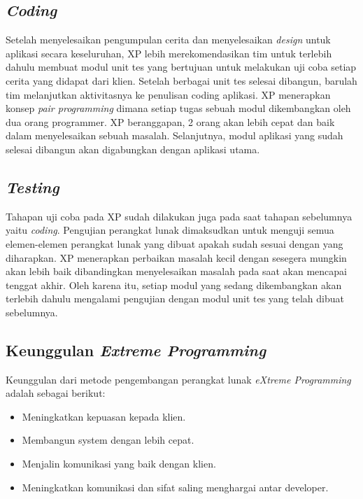 \subsection{\emph{Coding}}
\par Setelah menyelesaikan pengumpulan cerita dan menyelesaikan \textit{design} untuk aplikasi secara keseluruhan, XP lebih merekomendasikan tim untuk terlebih dahulu membuat modul unit tes yang bertujuan untuk melakukan uji coba setiap cerita yang didapat dari klien. Setelah berbagai unit tes selesai dibangun, barulah tim melanjutkan aktivitasnya ke penulisan coding aplikasi. XP menerapkan konsep \textit{pair programming} dimana setiap tugas sebuah modul dikembangkan oleh dua orang programmer. XP beranggapan, 2 orang akan lebih cepat dan baik dalam menyelesaikan sebuah masalah. Selanjutnya, modul aplikasi yang sudah selesai dibangun akan digabungkan dengan aplikasi utama.

\subsection{\emph{Testing}}
\par Tahapan uji coba pada XP sudah dilakukan juga pada saat tahapan sebelumnya yaitu \textit{coding}. Pengujian perangkat lunak dimaksudkan untuk menguji semua elemen-elemen perangkat lunak yang dibuat apakah sudah sesuai dengan yang diharapkan. XP menerapkan perbaikan masalah kecil dengan sesegera mungkin akan lebih baik dibandingkan menyelesaikan masalah pada saat akan mencapai tenggat akhir. Oleh karena itu, setiap modul yang sedang dikembangkan akan terlebih dahulu mengalami pengujian dengan modul unit tes yang telah dibuat sebelumnya.

\subsection{Keunggulan \textit{Extreme Programming}}
\par Keunggulan dari metode pengembangan perangkat lunak \textit{eXtreme Programming} adalah sebagai berikut: \cite{Michael}
\begin{itemize}
	\itemsep0em
	\item Meningkatkan kepuasan kepada klien.
	\item Membangun system dengan lebih cepat.
	\item Menjalin komunikasi yang baik dengan klien.
	\item Meningkatkan komunikasi dan sifat saling menghargai antar developer.
\end{itemize}

